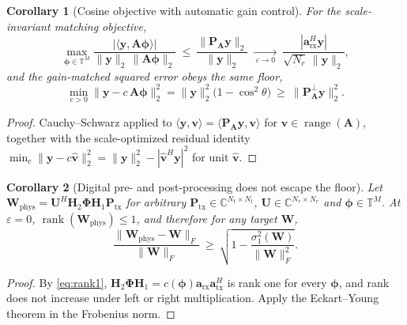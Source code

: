 \documentclass[11pt]{article}
\newtheorem{corollary}{Corollary}
\theoremstyle{remark}
\begin{document}
\begin{corollary}[Cosine objective with automatic gain control]
\label{cor:cosine}
For the scale-invariant matching objective,
\begin{equation}
\max_{\boldsymbol{\phi}\in\mathbb{T}^{M}}
\frac{\bigl|\langle\mathbf{y},\mathbf{A}\boldsymbol{\phi}\rangle\bigr|}
     {\|\mathbf{y}\|_2\,\|\mathbf{A}\boldsymbol{\phi}\|_2}
\ \le\
\frac{\|\mathbf{P}_{\mathbf{A}}\mathbf{y}\|_2}{\|\mathbf{y}\|_2}
\ \xrightarrow[\ \varepsilon\to0\ ]{}\
\frac{|\mathbf{a}_{\mathrm{rx}}^{H}\mathbf{y}|}
     {\sqrt{N_r}\,\|\mathbf{y}\|_2},
\label{eq:cosbound}
\end{equation}
and the gain-matched squared error obeys the same floor,
\begin{equation}
\min_{c>0}\|\mathbf{y}-c\,\mathbf{A}\boldsymbol{\phi}\|_2^2
=\|\mathbf{y}\|_2^2\bigl(1-\cos^2\theta\bigr)
\ \ge\ \bigl\|\mathbf{P}^{\perp}_{\mathbf{A}}\mathbf{y}\bigr\|_2^2 .
\label{eq:agc}
\end{equation}
\end{corollary}

\begin{proof}
Cauchy--Schwarz applied to
$\langle\mathbf{y},\mathbf{v}\rangle
 =\langle\mathbf{P}_{\mathbf{A}}\mathbf{y},\mathbf{v}\rangle$ for
$\mathbf{v}\in\operatorname{range}(\mathbf{A})$, together with the
scale-optimized residual identity
$\min_c\|\mathbf{y}-c\hat{\mathbf{v}}\|_2^2
 =\|\mathbf{y}\|_2^2-|\hat{\mathbf{v}}^{H}\mathbf{y}|^2$ for unit
$\hat{\mathbf{v}}$.
\end{proof}

\begin{corollary}[Digital pre- and post-processing does not escape the floor]
\label{cor:airfc}
Let
$\mathbf{W}_{\mathrm{phys}}
 =\mathbf{U}^{H}\mathbf{H}_2\boldsymbol{\Phi}\mathbf{H}_1
  \mathbf{P}_{\mathrm{tx}}$
for arbitrary $\mathbf{P}_{\mathrm{tx}}\in\mathbb{C}^{N_t\times N_t}$,
$\mathbf{U}\in\mathbb{C}^{N_r\times N_r}$ and
$\boldsymbol{\phi}\in\mathbb{T}^{M}$. At $\varepsilon=0$,
$\operatorname{rank}(\mathbf{W}_{\mathrm{phys}})\le1$, and therefore for any
target $\mathbf{W}$,
\begin{equation}
\frac{\|\mathbf{W}_{\mathrm{phys}}-\mathbf{W}\|_F}{\|\mathbf{W}\|_F}
\ \ge\
\sqrt{1-\frac{\sigma_1^2(\mathbf{W})}{\|\mathbf{W}\|_F^2}} .
\label{eq:eckartyoung}
\end{equation}
\end{corollary}

\begin{proof}
By \eqref{eq:rank1},
$\mathbf{H}_2\boldsymbol{\Phi}\mathbf{H}_1
 =c(\boldsymbol{\phi})\mathbf{a}_{\mathrm{rx}}\mathbf{a}_{\mathrm{tx}}^{H}$
is rank one for every $\boldsymbol{\phi}$, and rank does not increase under left
or right multiplication. Apply the Eckart--Young theorem in the Frobenius norm.
\end{proof}
\end{document}
